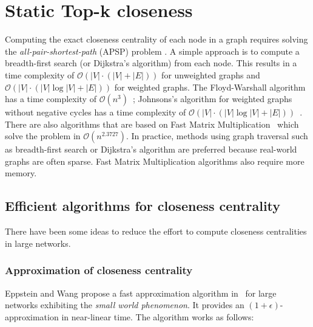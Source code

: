 \chapter{Static Top-k closeness}
\label{ch:staticCloseness}

Computing the exact closeness centrality of each node in a graph requires solving the \emph{all-pair-shortest-path} (APSP) problem . A simple approach is to compute a breadth-first search (or Dijkstra's algorithm) from each node. This results in a time complexity of $\mathcal{O}(|V| \cdot (|V| + |E|))$ for unweighted graphs and $\mathcal{O}(|V| \cdot (|V|\log{|V|} + |E|))$ for weighted graphs. The Floyd-Warshall algorithm has a time complexity of $\mathcal{O}(n^3)$~\cite{Floyd:1962:A9S:367766.368168}; Johnsons's algorithm for weighted graphs without negative cycles has a time complexity of $\mathcal{O}(|V| \cdot (|V|\log{|V|} + |E|))$~\cite{Johnson:1977:EAS:321992.321993}. There are also algorithms that are based on Fast Matrix Multiplication~\cite{zwick2002all,williams2012multiplying} which solve the problem in $\mathcal{O}(n^{2.3727})$. In practice, methods using graph traversal such as breadth-first search or Dijkstra's algorithm are preferred because real-world graphs are often sparse. Fast Matrix Multiplication algorithms also require more memory. 

\section{Efficient algorithms for closeness centrality}
\label{sec:closenessAlgorithms}

There have been some ideas to reduce the effort to compute closeness centralities in large networks.

\subsection{Approximation of closeness centrality}
Eppstein and Wang propose a fast approximation algorithm in~\cite{eppstein2001fast} for large networks exhibiting the \emph{small world phenomenon}. It provides an $(1 + \epsilon)$-approximation in near-linear time. The algorithm works as follows:

